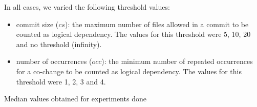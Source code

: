 \documentclass[conference]{IEEEtran}
\begin{document}
In all cases, we varied the following threshold values: 
 \begin{itemize}
	\item commit size ($cs$): the maximum number of files allowed in a commit to be counted as logical dependency. The values for this threshold were 5, 10, 20 and no threshold (infinity).  
	\item number of occurrences ($occ$): the minimum number of repeated occurrences for a co-change to be counted as logical dependency. The values for this threshold were 1, 2, 3 and 4.  
\end{itemize}



\begin{table}[!h]
\renewcommand{\arraystretch}{1.10}
\caption{Median values obtained for experiments done}
\label{tab:perc}
\centering


\end{table}
\end{document}
